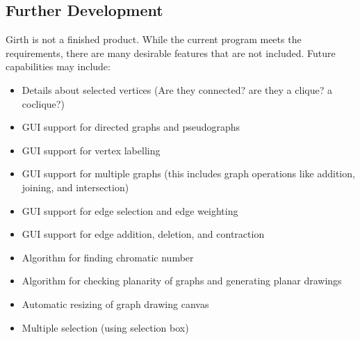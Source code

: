 \documentclass{article}
\begin{document}
\subsection{Further Development}

Girth is not a finished product. While the current program meets the requirements,
there are many desirable features that are not included.
Future capabilities may include:
\begin{itemize}
  \item Details about selected vertices (Are they connected? are they a clique? a coclique?)
  \item GUI support for directed graphs and pseudographs
  \item GUI support for vertex labelling
  \item GUI support for multiple graphs (this includes graph operations like addition, joining, and intersection)
  \item GUI support for edge selection and edge weighting
  \item GUI support for edge addition, deletion, and contraction
  \item Algorithm for finding chromatic number
  \item Algorithm for checking planarity of graphs and generating planar drawings
  \item Automatic resizing of graph drawing canvas
  \item Multiple selection (using selection box)
\end{itemize}
\end{document}
